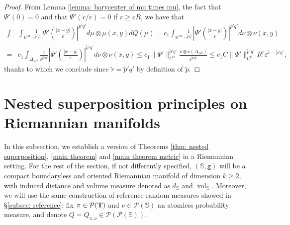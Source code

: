 \documentclass[10pt,leqno]{amsart}
\numberwithin{equation}{section}
\newcommand{\R}{\mathbb{R}}
\newcommand{\Q}{\mathbb{Q}}
\newcommand{\PP}{\mathcal{P}}
\newcommand{\ttg}{\mathtt{g}}
\renewcommand{\Q}{Q}
\newcommand{\Ss}{\mathbb{S}}
\begin{document}
\begin{proof}
	From Lemma \ref{lemma: barycenter of mu times mu}, the fact that $\Psi'(0) = 0$ and that $\Psi'(r/\varepsilon) = 0$ if $r \geq \varepsilon R$, we have that
	\begin{align*}
		\int & \int_{\R^{2d}}  \frac{1}{\varepsilon^{\tilde{p}'q'}} \left| \Psi'\left(\frac{|x-y|}{\varepsilon}\right) \right|^{\tilde{p}'q'} d\mu\otimes \mu(x,y) d\Q(\mu) = c_1 \int_{\R^{2d}} \frac{1}{\varepsilon^{\tilde{p}'q'}} \left| \Psi'\left( \frac{|x-y|}{\varepsilon} \right) \right|^{\tilde{p}'q'} d\nu\otimes \nu(x,y)
		\\
		= & c_1 \int_{\Delta_{\varepsilon R}} \frac{1}{\varepsilon^{\tilde{p}'q'}} \left| \Psi'\left(\frac{|x-y|}{\varepsilon}\right) \right|^{\tilde{p}'q'} d\nu\otimes \nu(x,y) \leq c_1 \|\Psi'\|_{C^0}^{\tilde{p}'q'} \frac{\nu\otimes\nu (\Delta_{\varepsilon R}) }{\varepsilon^{\tilde{p}'q'}}  \leq  c_1 C \|\Psi'\|_{C^0}^{\tilde{p}'q'}  R^{\tilde{r}}\varepsilon^{\tilde{r}- \tilde{p}'q'},
	\end{align*}
	thanks to which we conclude since $\tilde{r} = \tilde{p}'q'$ by definition of $\tilde{p}$.
\end{proof}

\section{Nested superposition principles on Riemannian manifolds}\label{sec: manifold}
In this subsection, we establish a version of Theorems \ref{thm: nested superposition}, \ref{main theorem} and \ref{main theorem metric} in a Riemannian setting. For the rest of the section, if not differently specified, $(\mathbb{S},\ttg)$ will be a compact boundaryless and oriented Riemannian manifold of dimension $k \geq 2$, with induced distance and volume measure denoted as $d_{\mathbb{S}}$ and $\operatorname{vol}_{\mathbb{S}}$. Moreover, we will use the same construction of reference random measures showed in §\ref{subsec: reference}: fix $\pi \in \PP(\bold{T})$ and $\nu\in \PP(\mathbb{S})$ an atomless probability measure, and denote $Q = Q_{\pi,\nu} \in \PP(\PP(\Ss))$.
\end{document}

